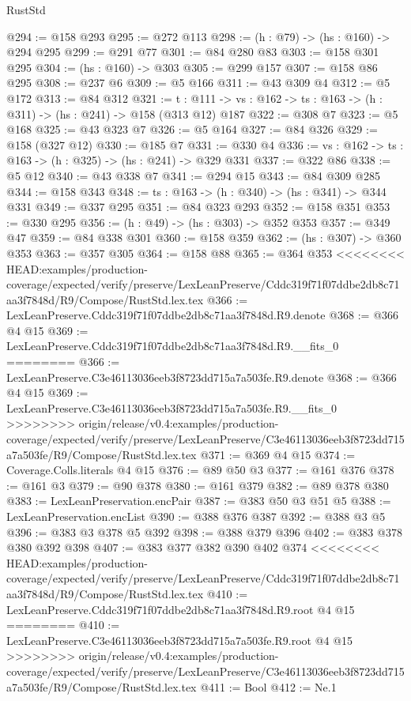 \begin{lexlean}{RustStd}
\begin{coremodule}
{\begin{coremodule}
@294 := @158 @293
@295 := @272 @113
@298 := (h : @79) -> (hs : @160) -> @294 @295
@299 := @291 @77
@301 := @84 @280 @83
@303 := @158 @301 @295
@304 := (hs : @160) -> @303
@305 := @299 @157
@307 := @158 @86 @295
@308 := @237 @6
@309 := @5 @166
@311 := @43 @309 @4
@312 := @5 @172
@313 := @84 @312
@321 := {t : @111} ->
  {vs : @162} -> {ts : @163} -> (h : @311) -> (hs : @241) -> @158 (@313 @12) @187
@322 := @308 @7
@323 := @5 @168
@325 := @43 @323 @7
@326 := @5 @164
@327 := @84 @326
@329 := @158 (@327 @12)
@330 := @185 @7
@331 := @330 @4
@336 := {vs : @162} -> {ts : @163} -> (h : @325) -> (hs : @241) -> @329 @331
@337 := @322 @86
@338 := @5 @12
@340 := @43 @338 @7
@341 := @294 @15
@343 := @84 @309 @285
@344 := @158 @343
@348 := {ts : @163} -> (h : @340) -> (hs : @341) -> @344 @331
@349 := @337 @295
@351 := @84 @323 @293
@352 := @158 @351
@353 := @330 @295
@356 := (h : @49) -> (hs : @303) -> @352 @353
@357 := @349 @47
@359 := @84 @338 @301
@360 := @158 @359
@362 := (hs : @307) -> @360 @353
@363 := @357 @305
@364 := @158 @88
@365 := @364 @353
<<<<<<<< HEAD:examples/production-coverage/expected/verify/preserve/LexLeanPreserve/Cddc319f71f07ddbe2db8c71aa3f7848d/R9/Compose/RustStd.lex.tex
@366 := LexLeanPreserve.Cddc319f71f07ddbe2db8c71aa3f7848d.R9.denote
@368 := @366 @4 @15
@369 := LexLeanPreserve.Cddc319f71f07ddbe2db8c71aa3f7848d.R9.__fits_0
========
@366 := LexLeanPreserve.C3e46113036eeb3f8723dd715a7a503fe.R9.denote
@368 := @366 @4 @15
@369 := LexLeanPreserve.C3e46113036eeb3f8723dd715a7a503fe.R9.__fits_0
>>>>>>>> origin/release/v0.4:examples/production-coverage/expected/verify/preserve/LexLeanPreserve/C3e46113036eeb3f8723dd715a7a503fe/R9/Compose/RustStd.lex.tex
@371 := @369 @4 @15
@374 := Coverage.Colls.literals @4 @15
@376 := @89 @50 @3
@377 := @161 @376
@378 := @161 @3
@379 := @90 @378
@380 := @161 @379
@382 := @89 @378 @380
@383 := LexLeanPreservation.encPair
@387 := @383 @50 @3 @51 @5
@388 := LexLeanPreservation.encList
@390 := @388 @376 @387
@392 := @388 @3 @5
@396 := @383 @3 @378 @5 @392
@398 := @388 @379 @396
@402 := @383 @378 @380 @392 @398
@407 := @383 @377 @382 @390 @402 @374
<<<<<<<< HEAD:examples/production-coverage/expected/verify/preserve/LexLeanPreserve/Cddc319f71f07ddbe2db8c71aa3f7848d/R9/Compose/RustStd.lex.tex
@410 := LexLeanPreserve.Cddc319f71f07ddbe2db8c71aa3f7848d.R9.root @4 @15
========
@410 := LexLeanPreserve.C3e46113036eeb3f8723dd715a7a503fe.R9.root @4 @15
>>>>>>>> origin/release/v0.4:examples/production-coverage/expected/verify/preserve/LexLeanPreserve/C3e46113036eeb3f8723dd715a7a503fe/R9/Compose/RustStd.lex.tex
@411 := Bool
@412 := Ne.{1}

\end{coremodule}}
\end{coremodule}
\end{lexlean}
